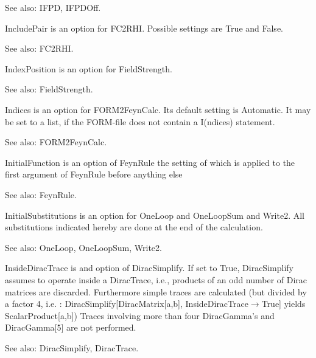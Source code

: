 See also:  IFPD, IFPDOff.



IncludePair is an option for FC2RHI. Possible settings are True and False.

See also:  FC2RHI.



IndexPosition is an option for FieldStrength.

See also:  FieldStrength.



Indices is an option for FORM2FeynCalc. Its default setting is Automatic. It may be set to a list, if the FORM-file does not contain a
  I(ndices) statement.

See also:  FORM2FeynCalc.



InitialFunction is an option of FeynRule the setting of which is applied to the first argument of FeynRule before anything else

See also:  FeynRule.



InitialSubstitutions is an option for OneLoop and OneLoopSum and Write2. All substitutions indicated hereby are done at the end of the
  calculation.

See also:  OneLoop, OneLoopSum, Write2.



InsideDiracTrace is and option of DiracSimplify. If set to True, DiracSimplify assumes to operate inside a DiracTrace, i.e., products of
  an odd number of Dirac matrices are discarded. Furthermore simple traces are calculated (but divided by a factor 4, i.e. : {
  }DiracSimplify[DiracMatrix[a,b], InsideDiracTrace\(\rightarrow \)True] { }yields ScalarProduct[a,b]) Traces involving more than four
  DiracGamma's and DiracGamma[5] are not performed.

See also:  DiracSimplify, DiracTrace.



